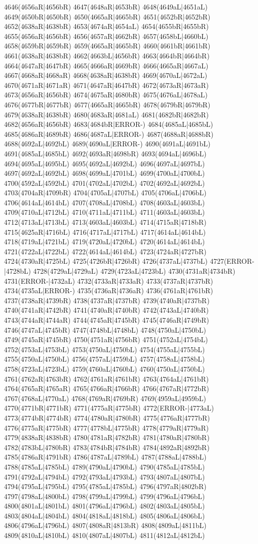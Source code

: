 4646(4656aR|4656bR) 4647(4648aR|4653bR) 4648(4649aL|4651aL) 4649(4650bR|4650bR) 4650(4665aR|4665bR) 4651(4652bR|4652bR) 4652(4638aR|4638bR) 4653(4674aR|4654aL) 4654(4655bR|4655bR) 4655(4656aR|4656bR) 4656(4657aR|4662bR) 4657(4658bL|4660bL) 4658(4659bR|4659bR) 4659(4665aR|4665bR) 4660(4661bR|4661bR) 4661(4638aR|4638bR) 4662(4663bL|4656bR) 4663(4664bR|4664bR) 4664(4647aR|4647bR) 4665(4666aR|4669bR) 4666(4665aR|4667aL) 4667(4668aR|4668aR) 4668(4638aR|4638bR) 4669(4670aL|4672aL) 4670(4671aR|4671aR) 4671(4647aR|4647bR) 4672(4673aR|4673aR) 4673(4656aR|4656bR) 4674(4675aR|4680bR) 4675(4676aL|4678aL) 4676(4677bR|4677bR) 4677(4665aR|4665bR) 4678(4679bR|4679bR) 4679(4638aR|4638bR) 4680(4683aR|4681aL) 4681(4682bR|4682bR) 4682(4656aR|4656bR) 4683(4684bR|ERROR-) 4684(4685aL|4685bL) 4685(4686aR|4689bR) 4686(4687aL|ERROR-) 4687(4688aR|4688bR) 4688(4692aL|4692bL) 4689(4690aL|ERROR-) 4690(4691aL|4691bL) 4691(4685aL|4685bL) 4692(4693aR|4698bR) 4693(4694aL|4696bL) 4694(4695aL|4695bL) 4695(4692aL|4692bL) 4696(4697aL|4697bL) 4697(4692aL|4692bL) 4698(4699aL|4701bL) 4699(4700aL|4700bL) 4700(4592aL|4592bL) 4701(4702aL|4702bL) 4702(4692aL|4692bL) 4703(4704aR|4709bR) 4704(4705aL|4707bL) 4705(4706aL|4706bL) 4706(4614aL|4614bL) 4707(4708aL|4708bL) 4708(4603aL|4603bL) 4709(4710aL|4712bL) 4710(4711aL|4711bL) 4711(4603aL|4603bL) 4712(4713aL|4713bL) 4713(4603aL|4603bL) 4714(4715aR|4718bR) 4715(4625aR|4716bL) 4716(4717aL|4717bL) 4717(4614aL|4614bL) 4718(4719aL|4721bL) 4719(4720aL|4720bL) 4720(4614aL|4614bL) 4721(4722aL|4722bL) 4722(4614aL|4614bL) 4723(4724aR|4727bR) 4724(4730aR|4725bL) 4725(4726bR|4726bR) 4726(4737aL|4737bL) 4727(ERROR-|4728bL) 4728(4729aL|4729aL) 4729(4723aL|4723bL) 4730(4731aR|4734bR) 4731(ERROR-|4732aL) 4732(4733aR|4733aR) 4733(4737aR|4737bR) 4734(4735aL|ERROR-) 4735(4736aR|4736aR) 4736(4761aR|4761bR) 4737(4738aR|4739bR) 4738(4737aR|4737bR) 4739(4740aR|4737bR) 4740(4741aR|4742bR) 4741(4740aR|4740bR) 4742(4743aL|4740bR) 4743(4744aR|4744aR) 4744(4745aR|4745bR) 4745(4746aR|4749bR) 4746(4747aL|4745bR) 4747(4748bL|4748bL) 4748(4750aL|4750bL) 4749(4745aR|4745bR) 4750(4751aR|4756bR) 4751(4752aL|4754bL) 4752(4753aL|4753bL) 4753(4750aL|4750bL) 4754(4755aL|4755bL) 4755(4750aL|4750bL) 4756(4757aL|4759bL) 4757(4758aL|4758bL) 4758(4723aL|4723bL) 4759(4760aL|4760bL) 4760(4750aL|4750bL) 4761(4762aR|4763bR) 4762(4761aR|4761bR) 4763(4764aL|4761bR) 4764(4765aR|4765aR) 4765(4766aR|4766bR) 4766(4767aR|4772bR) 4767(4768aL|4770aL) 4768(4769aR|4769bR) 4769(4959aL|4959bL) 4770(4771bR|4771bR) 4771(4775aR|4775bR) 4772(ERROR-|4773aL) 4773(4774bR|4774bR) 4774(4780aR|4780bR) 4775(4776aR|4777bR) 4776(4775aR|4775bR) 4777(4778bL|4775bR) 4778(4779aR|4779aR) 4779(4838aR|4838bR) 4780(4781aR|4782bR) 4781(4780aR|4780bR) 4782(4783bL|4780bR) 4783(4784bR|4784bR) 4784(4892aR|4892bR) 4785(4786aR|4791bR) 4786(4787aL|4789bL) 4787(4788aL|4788bL) 4788(4785aL|4785bL) 4789(4790aL|4790bL) 4790(4785aL|4785bL) 4791(4792aL|4794bL) 4792(4793aL|4793bL) 4793(4807aL|4807bL) 4794(4795aL|4795bL) 4795(4785aL|4785bL) 4796(4797aR|4802bR) 4797(4798aL|4800bL) 4798(4799aL|4799bL) 4799(4796aL|4796bL) 4800(4801aL|4801bL) 4801(4796aL|4796bL) 4802(4803aL|4805bL) 4803(4804aL|4804bL) 4804(4818aL|4818bL) 4805(4806aL|4806bL) 4806(4796aL|4796bL) 4807(4808aR|4813bR) 4808(4809aL|4811bL) 4809(4810aL|4810bL) 4810(4807aL|4807bL) 4811(4812aL|4812bL) 
